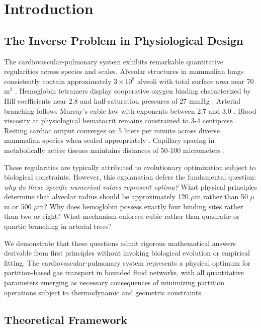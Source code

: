 \documentclass[12pt,a4paper]{article}
\theoremstyle{remark}
\begin{document}
\tableofcontents
\newpage

\section{Introduction}

\subsection{The Inverse Problem in Physiological Design}

The cardiovascular-pulmonary system exhibits remarkable quantitative regularities across species and scales. Alveolar structures in mammalian lungs consistently contain approximately $3 \times 10^{8}$ alveoli with total surface area near 70 m$^{2}$ \cite{weibel1963morphometry}. Hemoglobin tetramers display cooperative oxygen binding characterized by Hill coefficients near 2.8 and half-saturation pressures of 27 mmHg \cite{perutz1970stereochemistry}. Arterial branching follows Murray's cubic law with exponents between 2.7 and 3.0 \cite{sherman1981meaning}. Blood viscosity at physiological hematocrit remains constrained to 3-4 centipoise \cite{chien1970blood}. Resting cardiac output converges on 5 liters per minute across diverse mammalian species when scaled appropriately \cite{holt1968hemodynamic}. Capillary spacing in metabolically active tissues maintains distances of 50-100 micrometers \cite{krogh1919number}.

These regularities are typically attributed to evolutionary optimization subject to biological constraints. However, this explanation defers the fundamental question: \textit{why do these specific numerical values represent optima?} What physical principles determine that alveolar radius should be approximately 120 $\mu$m rather than 50 $\mu$m or 500 $\mu$m? Why does hemoglobin possess exactly four binding sites rather than two or eight? What mechanism enforces cubic rather than quadratic or quartic branching in arterial trees?

We demonstrate that these questions admit rigorous mathematical answers derivable from first principles without invoking biological evolution or empirical fitting. The cardiovascular-pulmonary system represents a physical optimum for partition-based gas transport in bounded fluid networks, with all quantitative parameters emerging as necessary consequences of minimizing partition operations subject to thermodynamic and geometric constraints.

\subsection{Theoretical Framework}
\end{document}
